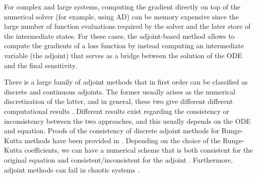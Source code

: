 
For complex and large systems, computing the gradient directly on top of the numerical solver (for example, using AD) can be memory expensive since the large number of function evaluations required by the solver and the later store of the intermediate states. 
For these cases, the adjoint-based method allows to compute the gradients of a loss function by instead computing an intermediate variable (the adjoint) that serves as a bridge between the solution of the ODE and the final sensitivity. 

There is a large family of adjoint methods that in first order can be classified as discrete and continuous adjoints. 
The former usually arises as the numerical discretization of the latter, and in general, these two give different different computational results \cite{Sirkes_Tziperman_1997}.
Different results exist regarding the consistency or inconsistency between the two approaches, and this usually depends on the ODE and equation.  
Proofs of the consistency of discrete adjoint methods for Runge-Kutta methods have been provided in \cite{sandu2006properties, sandu2011solution}.
Depending on the choice of the Runge-Kutta coefficients, we can have a numerical scheme that is both consistent for the original equation and consistent/inconsistent for the adjoint \cite{Hager_2000}.
Furthermore, adjoint methods can fail in chaotic systems \cite{Wang2012-chaos-adjoint}.
